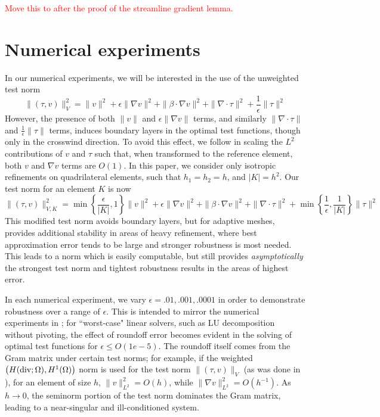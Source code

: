 \documentclass[11pt,onecolumn]{scrartcl}
\newcommand{\grad}{\nabla}
\renewcommand{\div}{\grad \cdot}
\begin{document}
\textcolor{red}{Move this to after the proof of the streamline gradient lemma.}	

\section{Numerical experiments}

In our numerical experiments, we will be interested in the use of the unweighted test norm 
\[
\|\left(\tau, v\right)\|_{V}^2 = \|v\|^2 + \epsilon \|\grad v\|^2 + \|\beta \cdot \grad v\|^2 + \| \div \tau\|^2 + \frac{1}{\epsilon}\|\tau\|^2
\]
However, the presence of both $\|v\|$ and $\epsilon\|\grad v\|$ terms, and similarly $\|\div \tau\|$ and $\frac{1}{\epsilon}\|\tau\|$ terms, induces boundary layers in the optimal test functions, though only in the crosswind direction.  To avoid this effect, we follow \cite{DPGrobustness} in scaling the $L^2$ contributions of $v$ and $\tau$ such that, when transformed to the reference element, both $v$ and $\grad v$ terms are $O(1)$.  In this paper, we consider only isotropic refinements on quadrilateral elements, such that $h_1 = h_2 = h$, and $|K| = h^2$. Our test norm for an element $K$ is now
\[
\|\left(\tau, v\right)\|_{V,K}^2 = \min\left\{\frac{\epsilon}{|K|},1\right\}\|v\|^2 + \epsilon \|\grad v\|^2 + \|\beta \cdot \grad v\|^2 + \| \div \tau\|^2 + \min\left\{\frac{1}{\epsilon},\frac{1}{|K|}\right\}\|\tau\|^2
\]
This modified test norm avoids boundary layers, but for adaptive meshes, provides additional stability in areas of heavy refinement, where best approximation error tends to be large and stronger robustness is most needed.  This leads to a norm which is easily computable, but still provides \textit{asymptotically} the strongest test norm and tightest robustness results in the areas of highest error.  



In each numerical experiment, we vary $\epsilon = .01, .001, .0001$ in order to demonstrate robustness over a range of $\epsilon$.  This is intended to mirror the numerical experiments in \cite{DPGrobustness}; for ``worst-case" linear solvers, such as LU decomposition without pivoting, the effect of roundoff error becomes evident in the solving of optimal test functions for $\epsilon \leq O(1e-5)$.  The roundoff itself comes from the Gram matrix under certain test norms; for example, if the weighted $\left(H({\rm div};\Omega), H^1(\Omega)\right)$ norm is used for the test norm $\|\left(\tau,v\right)\|_V$ (as was done in \cite{DPG2}), for an element of size $h$, $\|v\|_{L^2}^2 = O(h)$, while $\|\grad v\|_{L^2}^2 = O(h^{-1})$. As $h\rightarrow 0$, the seminorm portion of the test norm dominates the Gram matrix, leading to a near-singular and ill-conditioned system. 
\end{document}
